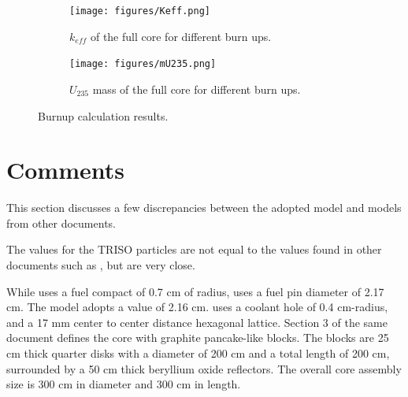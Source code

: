\documentclass[11pt,letterpaper]{article}
\begin{document}
	\begin{figure}[htbp!]
		\centering
		\begin{subfigure}[t]{0.4\textwidth}
			\centering
			\texttt{[image: figures/Keff.png]}
			\caption{$k_{eff}$ of the full core for different burn ups.}
		\end{subfigure}
		\begin{subfigure}[t]{0.4\textwidth}
			\centering
			\texttt{[image: figures/mU235.png]}
			\caption{$U_{235}$ mass of the full core for different burn ups.}
		\end{subfigure}
		\hfill
		\caption{Burnup calculation results.}
		\label{fig:results2}
	\end{figure}

\section{Comments}
\label{sec:comments}

This section discusses a few discrepancies between the adopted model and models from other documents.

The values for the TRISO particles are not equal to the values found in other documents such as \cite{venneri_neutronic_2015}, but are very close.

While \cite{venneri_neutronic_2015} uses a fuel compact of 0.7 cm of radius, \cite{hawari_development_2018} uses a fuel pin diameter of 2.17 cm. The model adopts a value of 2.16 cm.
\cite{venneri_neutronic_2015} uses a coolant hole of 0.4 cm-radius, and a 17 mm center to center distance hexagonal lattice.
Section 3 of the same document defines the core with graphite pancake-like blocks.
The blocks are 25 cm thick quarter disks with a diameter of 200 cm and a total length of 200 cm, surrounded by a 50 cm thick beryllium oxide reflectors.
The overall core assembly size is 300 cm in diameter and 300 cm in length.

\pagebreak


\end{document}
